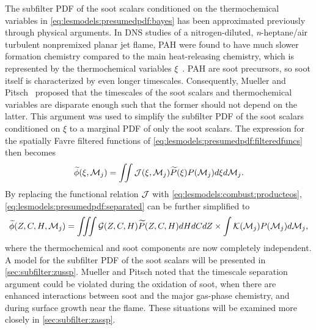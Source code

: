 The subfilter PDF of the soot scalars conditioned on the thermochemical variables in \cref{eq:lesmodels:presumedpdf:bayes} has been approximated previously through physical arguments. In DNS studies of a nitrogen-diluted, \textit{n}-heptane/air turbulent nonpremixed planar jet flame, PAH were found to have much slower formation chemistry compared to the main heat-releasing chemistry, which is represented by the thermochemical variables $\xi$~\cite{attili2014,bisetti2012}. PAH are soot precursors, so soot itself is characterized by even longer timescales. Consequently, Mueller and Pitsch~\cite{subfilterpdf2011} proposed that the timescales of the soot scalars and thermochemical variables are disparate enough such that the former should not depend on the latter. This argument was used to simplify the subfilter PDF of the soot scalars conditioned on $\xi$ to a marginal PDF of only the soot scalars. The expression for the spatially Favre filtered functions of \cref{eq:lesmodels:presumedpdf:filteredfuncs} then becomes
\begin{equation}\label{eq:lesmodels:presumedpdf:separated}
  \widetilde{\phi}(\xi,\mathcal{M}_j) = \iint \mathcal{J}(\xi,\mathcal{M}_j)\widetilde{P}(\xi)P(\mathcal{M}_j) d\xi d\mathcal{M}_j.
\end{equation}
By replacing the functional relation $\mathcal{J}$ with \cref{eq:lesmodels:combust:producteos}, \cref{eq:lesmodels:presumedpdf:separated} can be further simplified to
\begin{equation}\label{eq:lesmodels:presumedpdf:indep}
  \widetilde{\phi}(Z,C,H,\mathcal{M}_j) = \iiint \mathcal{G}(Z,C,H)\widetilde{P}(Z,C,H) dHdCdZ \times \int \mathcal{K}(\mathcal{M}_j)P(\mathcal{M}_j) d\mathcal{M}_j,
\end{equation}
where the thermochemical and soot components are now completely independent. A model for the subfilter PDF of the soot scalars will be presented in \cref{sec:subfilter:zussp}. Mueller and Pitsch noted that the timescale separation argument could be violated during the oxidation of soot, when there are enhanced interactions between soot and the major gas-phase chemistry, and during surface growth near the flame. These situations will be examined more closely in \cref{sec:subfilter:zassp}.

